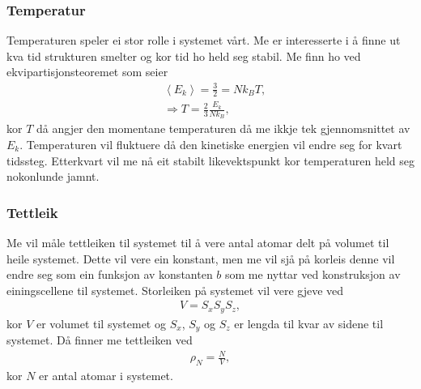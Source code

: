 \documentclass[12pt, a4paper]{article}
\theoremstyle{definition}
\begin{document}
        \subsubsection*{Temperatur}
            Temperaturen speler ei stor rolle i systemet vårt. Me er interesserte i å finne ut kva tid strukturen smelter og kor tid ho held seg stabil. Me finn ho 
            ved ekvipartisjonsteoremet som seier
            \begin{align*}
                &\left \langle E_{k} \right \rangle = \frac{3}{2} = Nk_{B}T, \\
                &\Rightarrow T = \frac{2}{3}\frac{E_{k}}{Nk_{B}},
            \end{align*}
            kor $T$ då angjer den momentane temperaturen då me ikkje tek gjennomsnittet av $E_{k}$. Temperaturen vil fluktuere då den kinetiske energien vil endre seg for
            kvart tidssteg. Etterkvart vil me nå eit stabilt likevektspunkt kor temperaturen held seg nokonlunde jamnt.


        \subsubsection*{Tettleik}
            Me vil måle tettleiken til systemet til å vere antal atomar delt på volumet til heile systemet. Dette vil vere ein konstant, men me vil sjå på korleis denne vil 
            endre seg som ein funksjon av konstanten $b$ som me nyttar ved konstruksjon av einingscellene til systemet. Storleiken på systemet vil vere gjeve ved
            \begin{align*}
                V = S_xS_yS_z,
            \end{align*}
            kor $V$ er volumet til systemet og $S_x$, $S_y$ og $S_z$ er lengda til kvar av sidene til systemet. Då finner me tettleiken ved
            \begin{align*}
                \rho_N = \frac{N}{V},
            \end{align*}
            kor $N$ er antal atomar i systemet.
\end{document}
